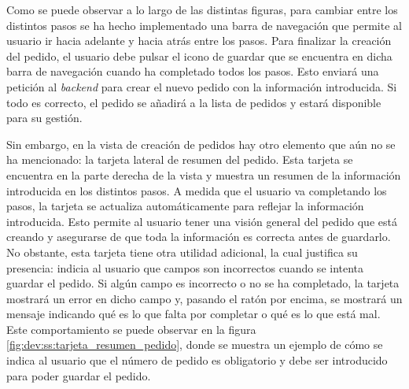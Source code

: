 Como se puede observar a lo largo de las distintas figuras, para cambiar entre los distintos pasos se ha hecho implementado una barra de navegación que permite al usuario ir hacia adelante y hacia atrás entre los pasos. Para finalizar la creación del pedido, el usuario debe pulsar el icono de guardar que se encuentra en dicha barra de navegación cuando ha completado todos los pasos. Esto enviará una petición al \textit{backend} para crear el nuevo pedido con la información introducida. Si todo es correcto, el pedido se añadirá a la lista de pedidos y estará disponible para su gestión.

Sin embargo, en la vista de creación de pedidos hay otro elemento que aún no se ha mencionado: la tarjeta lateral de resumen del pedido. Esta tarjeta se encuentra en la parte derecha de la vista y muestra un resumen de la información introducida en los distintos pasos. A medida que el usuario va completando los pasos, la tarjeta se actualiza automáticamente para reflejar la información introducida. Esto permite al usuario tener una visión general del pedido que está creando y asegurarse de que toda la información es correcta antes de guardarlo. No obstante, esta tarjeta tiene otra utilidad adicional, la cual justifica su presencia: indicia al usuario que campos son incorrectos cuando se intenta guardar el pedido. Si algún campo es incorrecto o no se ha completado, la tarjeta mostrará un error en dicho campo y, pasando el ratón por encima, se mostrará un mensaje indicando qué es lo que falta por completar o qué es lo que está mal. Este comportamiento se puede observar en la figura \ref{fig:dev:ss:tarjeta_resumen_pedido}, donde se muestra un ejemplo de cómo se indica al usuario que el número de pedido es obligatorio y debe ser introducido para poder guardar el pedido.

